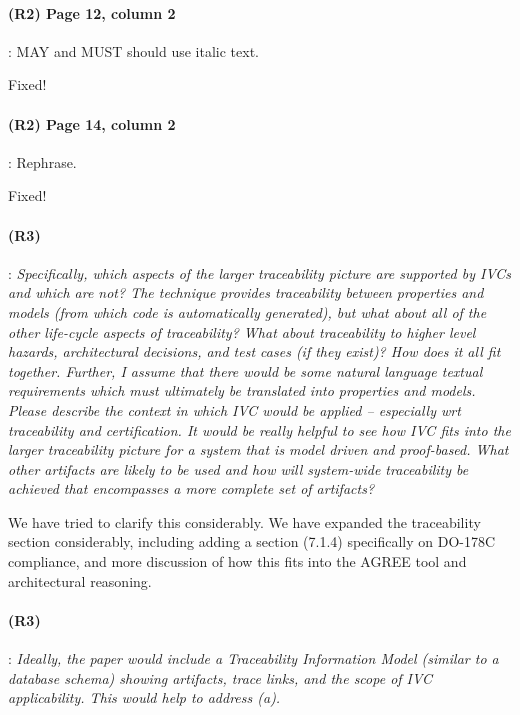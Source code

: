 \documentclass{article}
\begin{document}
\paragraph{(R2) Page 12, column 2} : MAY and MUST should use italic text.
\vspace{0.05in}

Fixed!

\paragraph{(R2) Page 14, column 2} : Rephrase.
\vspace{0.05in}

Fixed!

\paragraph{(R3)} : 
\textit{Specifically, which aspects of the larger traceability picture are supported by IVCs and which are not? The technique provides traceability between properties and models (from which code is automatically generated), but what about all of the other life-cycle aspects of traceability? What about traceability to higher level hazards, architectural decisions, and test cases (if they exist)? How does it all fit together. Further, I assume that there would be some natural language textual requirements which must ultimately be translated into properties and models.       Please describe the context in which IVC would be applied -- especially wrt traceability and certification. It would be really helpful to see how IVC fits into the larger traceability picture for a system that is model driven and proof-based. What other artifacts are likely to be used and how will system-wide traceability be achieved that encompasses a more complete set of artifacts?}
\vspace{0.05in}

We have tried to clarify this considerably.  We have expanded the traceability section considerably, including adding a section (7.1.4) specifically on DO-178C compliance, and more discussion of how this fits into the AGREE tool and architectural reasoning.
  
\paragraph{(R3)}: 
\textit{Ideally, the paper would include a Traceability Information Model (similar to a database schema) showing artifacts, trace links, and the scope of IVC applicability. This would help to address (a).}
\vspace{0.05in}
  
\end{document}
